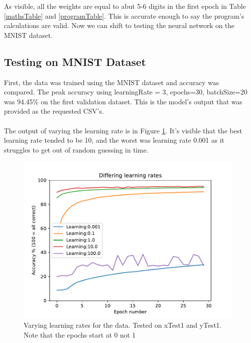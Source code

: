 \documentclass{article}
\begin{document}
As visible, all the weights are equal to abut 5-6 digits in the first epoch in Table
\ref{mathsTable} and \ref{programTable}. This is accurate enough to say the
program's calculations are valid. Now we can shift to testing the neural
network on the MNIST dataset.

\subsection{Testing on MNIST Dataset}



First, the data was trained using the MNIST dataset and accuracy was compared.
The peak accuracy using learningRate = 3, epochs=30, batchSize=20 was 94.45\%
on the first validation dataset. This is the model's output that was provided as
the requested CSV's.
\\ \\
The output of varying the learning rate is in Figure \ref{learning}. It's visible
that the best learning rate tended to be 10, and the worst was learning rate
0.001 as it struggles to get out of random guessing in time.

\begin{figure}[h]
    \centering
    \includegraphics[scale=1]{learningGraph.pdf}
    \caption{
        Varying learning rates for the data. Tested on xTest1 and yTest1. Note
        that the epochs start at 0 not 1
    }
    \label{learning}
\end{figure}
\end{document}
